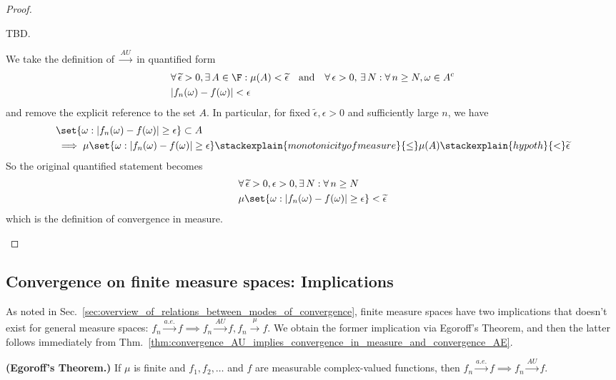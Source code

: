 \documentclass{article} %
\newcommand{\epsilontilde}{\widetilde{\epsilon}}
\newcommand{\convergenceAE}{\stackrel{a.e.}{\to}}
\newcommand{\convergenceAU}{\stackrel{AU}{\to}}
\newcommand{\convergenceInMu}{\stackrel{\mu}{\to}}
\begin{document}
\begin{proof}
\begin{alphabate}
\item TBD.
\item We take the definition of $\convergenceAU$ in quantified form  
\begin{align*}
&\forall \, \epsilontilde >0, \exists \, A \in \F : \mu(A) < \epsilontilde \quad \text{and} \quad \forall \, \epsilon >0, \, \exists \, N : \forall \, n \geq N, \omega \in A^c \\
& |f_n(\omega) - f(\omega) | < \epsilon 
\end{align*}
and remove the explicit reference to the set $A$. In particular, for fixed $\epsilontilde, \epsilon>0$ and sufficiently large $n$, we have
\begin{align*} 
& \set{\omega : |f_n(\omega) - f(\omega) | \geq \epsilon  } \subset A \\
&\implies \mu\set{\omega : |f_n(\omega) - f(\omega) | \geq \epsilon  } \stackexplain{monotonicity of measure}{\leq} \mu(A) \stackexplain{hypoth}{<} \epsilontilde 
\end{align*}
So the original quantified statement becomes
\begin{align*}
&\forall \, \epsilontilde >0,  \epsilon >0, \exists \, N : \forall \, n \geq N \\
& \mu\set{\omega : |f_n(\omega) - f(\omega) | \geq \epsilon  } < \epsilontilde 
\end{align*}
which is the definition of convergence in measure. 
\end{alphabate}
\end{proof}

\subsection{Convergence on finite measure spaces: Implications}

As noted in Sec.~\ref{sec:overview_of_relations_between_modes_of_convergence}, finite measure spaces have two implications that doesn't exist for general measure spaces:  $f_n \convergenceAE f \implies f_n \convergenceAU f, f_n \convergenceInMu f$.  We obtain the former implication via Egoroff's Theorem, and then the latter follows immediately from Thm.~\ref{thm:convergence_AU_implies_convergence_in_measure_and_convergence_AE}.

\begin{theorem}\textbf{(Egoroff's Theorem.)} If $\mu$ is finite and $f_1, f_2, \hdots$ and $f$ are measurable complex-valued functions, then $f_n \convergenceAE f \implies f_n \convergenceAU f$.
\label{thm:egoroffs_theorem}
\end{theorem}
\end{document}
